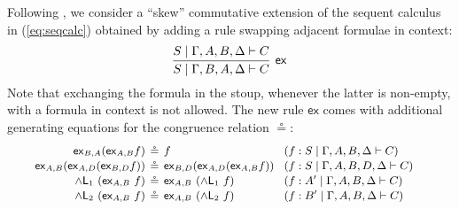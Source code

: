 \documentclass[submission,copyright,creativecommons]{eptcs}
\theoremstyle{definition}
\newcommand{\tl}{\otimes \mathsf{L}}
\newcommand{\tr}{\otimes \mathsf{R}}
\newcommand{\pass}{\mathsf{pass}}
\newcommand{\unitl}{\mathsf{IL}}
\newcommand{\andlone}{\land \mathsf{L}_{1}}
\newcommand{\andltwo}{\land \mathsf{L}_{2}}
\newcommand{\ex}{\mathsf{ex}}
\begin{document}
Following \cite{veltri:coherence:2021}, we consider a ``skew'' commutative extension of the sequent calculus in (\ref{eq:seqcalc}) obtained by adding a rule swapping adjacent  formulae in context:
\begin{displaymath}
  \infer[\ex]{S \mid \Gamma , B , A , \Delta \vdash C}{
    S \mid \Gamma , A , B , \Delta \vdash C
  }
\end{displaymath}
Note that exchanging the formula in the stoup, whenever the latter is non-empty, with a formula in context is not allowed. The new rule $\ex$ comes with additional generating equations for the congruence relation $\circeq$:
\begin{equation*}\label{fig:circeq:sym}
  \small
  \arraycolsep=2pt
  \def\arraystretch{1.1}
  \hspace{-8.9pt}
\begin{array}{rclll}
\ex_{B , A}  (\ex_{A , B}  f) &\circeq & f &&(f: S \mid \Gamma , A , B , \Delta \vdash C)
\\
\ex_{A , B}  (\ex_{A , D}  (\ex_{B , D}  f)) &\circeq & \ex_{B , D}  (\ex_{A , D}  (\ex_{A , B}  f)) &&(f : S \mid \Gamma , A , B , D , \Delta \vdash C) 
\\
  \andlone \ (\ex_{A , B} \ f) &\circeq &\ex_{A , B} \ (\andlone \ f) &&(f : A' \mid \Gamma , A , B , \Delta \vdash C)
  \\
  \andltwo \ (\ex_{A , B} \ f) &\circeq &\ex_{A , B} \ (\andltwo \ f) &&(f : B' \mid \Gamma , A , B , \Delta \vdash C)

\end{array}
\end{equation*}
\end{document}

